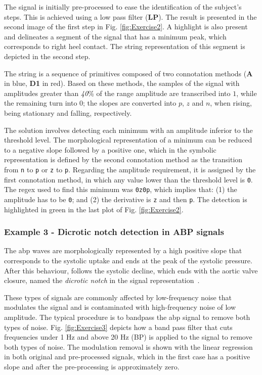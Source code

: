 The signal is initially pre-processed to ease the identification of the subject's steps. This is achieved using a low pass filter (\textbf{LP}). The result is presented in the second image of the first step in Fig. \ref{fig:Exercise2}. A highlight is also present and delineates a segment of the signal that has a minimum peak, which corresponds to right heel contact. The string representation of this segment is depicted in the second step.
\par
The string is a sequence of primitives composed of two connotation methods (\textbf{A} in blue, \textbf{D1} in red). Based on these methods, the samples of the signal with amplitudes greater than \textit{40}\% of the range amplitude are transcribed into $1$, while the remaining turn into $0$; the slopes are converted into $p$, $z$ and $n$, when rising, being stationary and falling, respectively.
\par
The solution involves detecting each minimum with an amplitude inferior to the threshold level. The morphological representation of a minimum can be reduced to a negative slope followed by a positive one, which in the symbolic representation is defined by the second connotation method as the transition from \texttt{n} to \texttt{p} or \texttt{z} to \texttt{p}. Regarding the amplitude requirement, it is assigned by the first connotation method, in which any value lower than the threshold level is \texttt{0}. The \gls{regex} used to find this minimum was \texttt{0z0p}, which implies that: (1) the amplitude has to be \texttt{0}; and (2) the derivative is \texttt{z} and then \texttt{p}. The detection is highlighted in green in the last plot of Fig. \ref{fig:Exercise2}.

\subsubsection{Example 3 - Dicrotic notch detection in ABP signals}

The \gls{abp} waves are morphologically represented by a high positive slope that corresponds to the systolic uptake and ends at the peak of the systolic pressure. After this behaviour, follows the systolic decline, which ends with the aortic valve closure, named the \textit{dicrotic notch} in the signal representation~\cite{abpSignal}.
\par
These types of signals are commonly affected by low-frequency noise that modulates the signal and is contaminated with high-frequency noise of low amplitude. The typical procedure is to bandpass the \gls{abp} signal to remove both types of noise. Fig. \ref{fig:Exercise3} depicts how a band pass filter that cuts frequencies under 1 Hz and above 20 Hz (BP) is applied to the signal to remove both types of noise. The modulation removal is shown with the linear regression in both original and pre-processed signals, which in the first case has a positive slope and after the pre-processing is approximately zero.

